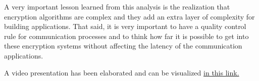 \documentclass[letterpaper,12pt]{article}
\begin{document}
A very important lesson learned from this analysis is the realization that encryption algorithms are complex and they add an extra layer of complexity for building applications. That said, it is very important to have a quality control rule for communication processes and to think how far it is possible to get into these encryption systems without affecting the latency of the communication applications.

A video presentation has been elaborated and can be visualized \href{https://youtu.be/cKevoex-4h8}{in this link.}



\end{document}
